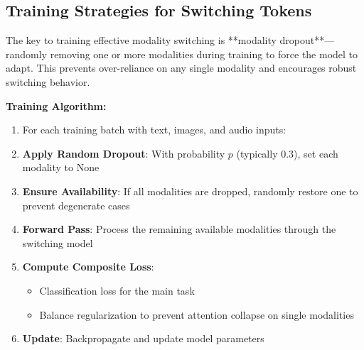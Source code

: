 \subsection{Training Strategies for Switching Tokens}
\begin{comment}
Feedback: Before the code, it's helpful to explain the core training strategy in simple terms. For example: "The key to training a model to switch between modalities is to force it to be robust to missing information. The most common technique is **modality dropout**, where during training, one or more modalities are randomly dropped from the input. This prevents the model from becoming overly reliant on any single modality and forces it to learn how to make the best possible prediction with whatever information it has available. This, in turn, trains the switching mechanism to identify which available modalities are most useful."
\end{comment}

The key to training effective modality switching is **modality dropout**—randomly removing one or more modalities during training to force the model to adapt. This prevents over-reliance on any single modality and encourages robust switching behavior.


\textbf{Training Algorithm:}
\begin{enumerate}
\item For each training batch with text, images, and audio inputs:
\item \textbf{Apply Random Dropout}: With probability $p$ (typically 0.3), set each modality to None
\item \textbf{Ensure Availability}: If all modalities are dropped, randomly restore one to prevent degenerate cases
\item \textbf{Forward Pass}: Process the remaining available modalities through the switching model
\item \textbf{Compute Composite Loss}: 
   \begin{itemize}
   \item Classification loss for the main task
   \item Balance regularization to prevent attention collapse on single modalities
   \end{itemize}
\item \textbf{Update}: Backpropagate and update model parameters
\end{enumerate}

